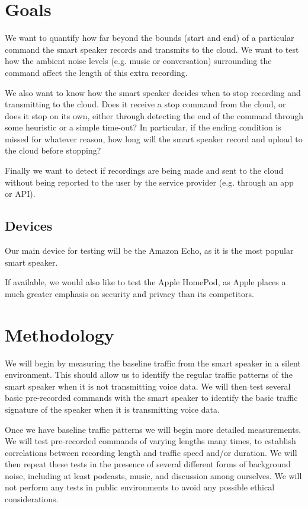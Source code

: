 \section{Goals}

We want to quantify how far beyond the bounds (start and end) of a particular command the smart speaker records and transmits to the cloud. We want to test how the ambient noise levels (e.g. music or conversation) surrounding the command affect the length of this extra recording.

We also want to know how the smart speaker decides when to stop recording and transmitting to the cloud. Does it receive a stop command from the cloud, or does it stop on its own, either through detecting the end of the command through some heuristic or a simple time-out? In particular, if the ending condition is missed for whatever reason, how long will the smart speaker record and upload to the cloud before stopping?

Finally we want to detect if recordings are being made and sent to the cloud without being reported to the user by the service provider (e.g. through an app or API).

\subsection{Devices}
Our main device for testing will be the Amazon Echo, as it is the most popular smart speaker.

If available, we would also like to test the Apple HomePod, as Apple places a much greater emphasis on security and privacy than its competitors.

\section{Methodology}

We will begin by measuring the baseline traffic from the smart speaker in a silent environment. This should allow us to identify the regular traffic patterns of the smart speaker when it is not transmitting voice data. We will then test several basic pre-recorded commands with the smart speaker to identify the basic traffic signature of the speaker when it is transmitting voice data.

Once we have baseline traffic patterns we will begin more detailed measurements. We will test pre-recorded commands of varying lengths many times, to establish correlations between recording length and traffic speed and/or duration. We will then repeat these tests in the presence of several different forms of background noise, including at least podcasts, music, and discussion among ourselves. We will not perform any tests in public environments to avoid any possible ethical considerations.

